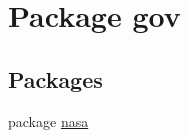 \hypertarget{namespacegov}{}\section{Package gov}
\label{namespacegov}
\subsection*{Packages}
\begin{DoxyCompactItemize}
\item 
package \hyperlink{namespacegov_1_1nasa}{nasa}
\end{DoxyCompactItemize}
